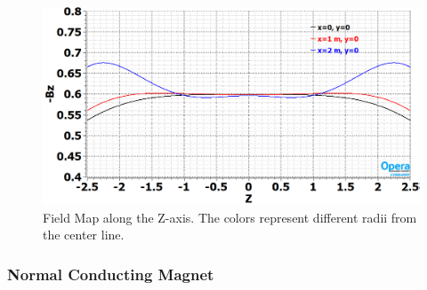 %
\begin{figure}[h] 
\centering
\includegraphics[width=0.95\columnwidth]{graphics/dune_nd_magnet_sc_fieldmap.png} 
\caption{Field Map along the Z-axis. The colors represent different radii from the center line.} 
\label{fig:dune_nd_magnet_sc_fieldmap} 
\end{figure}
%
\subsubsection{Normal Conducting Magnet}

